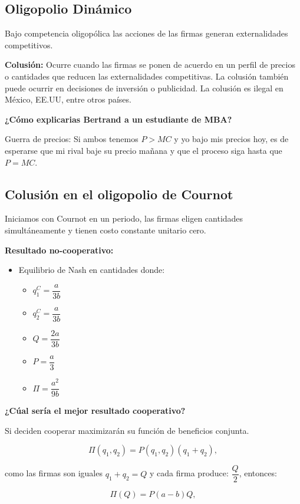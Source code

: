 \documentclass[letterpaper,12pt,twocolumn]{report}
\begin{document}
\subsection*{Oligopolio Dinámico}

Bajo competencia oligopólica las acciones de las firmas generan externalidades competitivos.

\textbf{Colusión:} Ocurre cuando las firmas se ponen de acuerdo en un perfil de precios o cantidades que reducen las externalidades competitivas. La colusión también puede ocurrir en decisiones de inversión o publicidad. La colusión es ilegal en México, EE.UU, entre otros países.

\textbf{¿Cómo explicarias Bertrand a un estudiante de MBA?}

Guerra de precios: Si ambos tenemos $P>MC$ y yo bajo mis precios hoy, es de esperarse que mi rival baje su precio mañana y que el proceso siga hasta que $P=MC$.

\subsection*{Colusión en el oligopolio de Cournot}

Iniciamos con Cournot en un periodo, las firmas eligen cantidades simultáneamente y tienen costo constante unitario cero.

\textbf{Resultado no-cooperativo:}

\begin{itemize}
	\item Equilibrio de Nash en cantidades donde: 
		\begin{itemize}
			\item $q_1^C=\dfrac{a}{3b}$ \item $q_2^C=\dfrac{a}{3b}$ \item $Q=\dfrac{2a}{3b}$ \item $P=\dfrac{a}{3}$  
			\item $\Pi=\dfrac{a^2}{9b}$
		\end{itemize}
\end{itemize}

\textbf{¿Cúal sería el mejor resultado cooperativo?}

Si deciden cooperar maximizarán su función de beneficios conjunta.

$$ \Pi (q_1,q_2)= P(q_1,q_2)(q_1+q_2),$$

como las firmas son iguales $q_1+q_2=Q$ y cada firma produce: $\dfrac{Q}{2}$, entonces:

$$ \Pi (Q)= P(a-b)Q,$$
\end{document}
